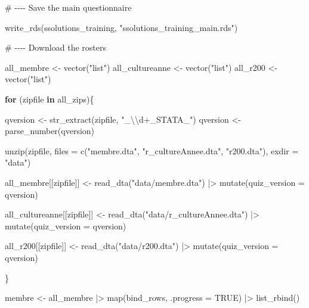 \documentclass[
  letterpaper,
  DIV=11,
  numbers=noendperiod]{scrreprt}
\newenvironment{Shaded}{\begin{snugshade}}{\end{snugshade}}
\newcommand{\AttributeTok}[1]{\textcolor[rgb]{0.40,0.45,0.13}{#1}}
\newcommand{\CommentTok}[1]{\textcolor[rgb]{0.37,0.37,0.37}{#1}}
\newcommand{\ConstantTok}[1]{\textcolor[rgb]{0.56,0.35,0.01}{#1}}
\newcommand{\ControlFlowTok}[1]{\textcolor[rgb]{0.00,0.23,0.31}{\textbf{#1}}}
\newcommand{\FunctionTok}[1]{\textcolor[rgb]{0.28,0.35,0.67}{#1}}
\newcommand{\NormalTok}[1]{\textcolor[rgb]{0.00,0.23,0.31}{#1}}
\newcommand{\OtherTok}[1]{\textcolor[rgb]{0.00,0.23,0.31}{#1}}
\newcommand{\SpecialCharTok}[1]{\textcolor[rgb]{0.37,0.37,0.37}{#1}}
\newcommand{\StringTok}[1]{\textcolor[rgb]{0.13,0.47,0.30}{#1}}
\begin{document}
\begin{Shaded}
\begin{Highlighting}[]
\CommentTok{\# {-}{-}{-}{-} Save the main questionnaire}

\FunctionTok{write\_rds}\NormalTok{(ssolutions\_training, }\StringTok{"ssolutions\_training\_main.rds"}\NormalTok{)}


\CommentTok{\# {-}{-}{-}{-} Download the rosters}

\NormalTok{all\_membre }\OtherTok{\textless{}{-}} \FunctionTok{vector}\NormalTok{(}\StringTok{"list"}\NormalTok{)}
\NormalTok{all\_cultureanne }\OtherTok{\textless{}{-}} \FunctionTok{vector}\NormalTok{(}\StringTok{"list"}\NormalTok{)}
\NormalTok{all\_r200 }\OtherTok{\textless{}{-}} \FunctionTok{vector}\NormalTok{(}\StringTok{"list"}\NormalTok{)}


\ControlFlowTok{for}\NormalTok{ (zipfile }\ControlFlowTok{in}\NormalTok{ all\_zips)\{}

\NormalTok{  qversion }\OtherTok{\textless{}{-}} \FunctionTok{str\_extract}\NormalTok{(zipfile, }\StringTok{"\_}\SpecialCharTok{\textbackslash{}\textbackslash{}}\StringTok{d+\_STATA\_"}\NormalTok{)}
\NormalTok{  qversion }\OtherTok{\textless{}{-}} \FunctionTok{parse\_number}\NormalTok{(qversion)}


  \FunctionTok{unzip}\NormalTok{(zipfile, }\AttributeTok{files =} \FunctionTok{c}\NormalTok{(}\StringTok{"membre.dta"}\NormalTok{, }\StringTok{"r\_cultureAnnee.dta"}\NormalTok{, }\StringTok{"r200.dta"}\NormalTok{),}
        \AttributeTok{exdir =} \StringTok{"data"}\NormalTok{)}


\NormalTok{  all\_membre[[zipfile]] }\OtherTok{\textless{}{-}} \FunctionTok{read\_dta}\NormalTok{(}\StringTok{"data/membre.dta"}\NormalTok{) }\SpecialCharTok{|\textgreater{}}
    \FunctionTok{mutate}\NormalTok{(}\AttributeTok{quiz\_version =}\NormalTok{ qversion)}
  
\NormalTok{  all\_cultureanne[[zipfile]] }\OtherTok{\textless{}{-}} \FunctionTok{read\_dta}\NormalTok{(}\StringTok{"data/r\_cultureAnnee.dta"}\NormalTok{) }\SpecialCharTok{|\textgreater{}}
    \FunctionTok{mutate}\NormalTok{(}\AttributeTok{quiz\_version =}\NormalTok{ qversion)}
  
  
\NormalTok{  all\_r200[[zipfile]] }\OtherTok{\textless{}{-}} \FunctionTok{read\_dta}\NormalTok{(}\StringTok{"data/r200.dta"}\NormalTok{) }\SpecialCharTok{|\textgreater{}}
    \FunctionTok{mutate}\NormalTok{(}\AttributeTok{quiz\_version =}\NormalTok{ qversion)}
  
\NormalTok{\}}


\NormalTok{membre }\OtherTok{\textless{}{-}}\NormalTok{ all\_membre }\SpecialCharTok{|\textgreater{}} 
  \FunctionTok{map}\NormalTok{(bind\_rows, }\AttributeTok{.progress =} \ConstantTok{TRUE}\NormalTok{) }\SpecialCharTok{|\textgreater{}}  
  \FunctionTok{list\_rbind}\NormalTok{() }



\end{Highlighting}
\end{Shaded}
\end{document}
